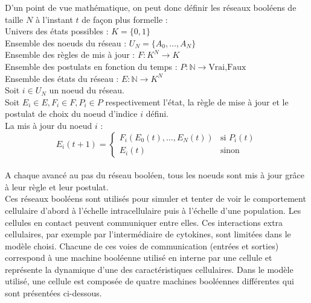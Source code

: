 \documentclass[11pt, a4paper]{article}
\begin{document}
D'un point de vue mathématique, on peut donc définir les réseaux booléens de
taille $N$ à l'instant $t$ de façon plus formelle : \\
Univers des états possibles : $ K = \{0, 1\} $ \\
Ensemble des noeuds du réseau : $ U_N = \{A_0, \dots, A_N\}$ \\
Ensemble des règles de mis à jour : $ F : K^N \rightarrow K $ \\
Ensemble des postulats en fonction du temps :
$ P : \mathbb{N} \rightarrow {\mbox{Vrai}, \mbox{Faux}} $ \\
Ensemble des états du réseau : $ E : \mathbb{N} \rightarrow K^N $ \\
Soit $i\in U_N$ un noeud du réseau. \\
Soit $E_i \in E, F_i \in F, P_i \in P$ respectivement l'état, la règle de mise
à jour et le postulat de choix du noeud d'indice $i$ défini. \\
La mis à jour du noeud $i$ :
$$
E_i(t + 1) =
\left\{\begin{array}{rl}
    F_i(E_0(t), \dots, E_N(t)) & \mbox{si $P_i(t)$} \\
    E_i(t) & \mbox{sinon}
\end{array}\right.
$$ \\
A chaque avancé au pas du réseau booléen, tous les noeuds sont mis à jour grâce
à leur règle et leur postulat. \\

Ces réseaux booléens sont utilisés pour simuler et tenter de voir le
comportement cellulaire d'abord à l'échelle intracellulaire puis à l'échelle
d'une population. Les cellules en contact peuvent communiquer entre elles. Ces
interactions extra cellulaires, par exemple par l'interm\'ediaire de cytokines, sont limitées dans le modèle
choisi. Chacune de ces voies de communication (entrées et sorties) correspond à une machine booléenne
utilisé en interne par une cellule et représente la dynamique d'une des
caractéristiques cellulaires. Dans le modèle utilisé, une cellule est composée
de quatre machines booléennes différentes qui sont présentées ci-dessous.
\end{document}
